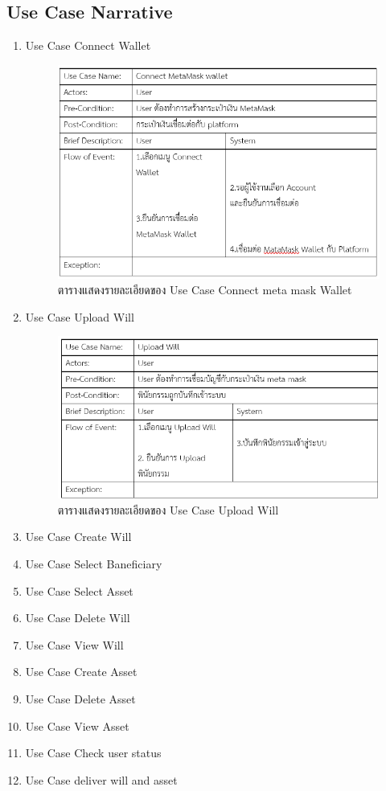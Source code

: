 \documentclass[12pt,oneside,openright,a4paper]{cpe-thai-project}
\begin{document}
\subsection{Use Case Narrative}
\begin{enumerate}[label=.\arabic*,leftmargin=0pt,itemindent=2.5cm]
\item Use Case Connect Wallet
	\begin{figure}[!htb]
		\centering
		\includegraphics[scale=0.8]{connectwallet}
		\caption{ตารางแสดงรายละเอียดของ Use Case Connect meta mask Wallet}
	\end{figure}
	\FloatBarrier
\item Use Case Upload Will
	\begin{figure}[!htb]
		\centering
		\includegraphics[scale=0.8]{uploadWill}
		\caption{ตารางแสดงรายละเอียดของ Use Case Upload Will}
	\end{figure}
	\FloatBarrier
\item Use Case Create Will
\item Use Case Select Baneficiary
\item Use Case Select Asset
\item Use Case Delete Will
\item Use Case View Will
\item Use Case Create Asset
\item Use Case Delete Asset
\item Use Case View Asset
\item Use Case Check user status
\item Use Case deliver will and asset
\end{enumerate}
\end{document}
